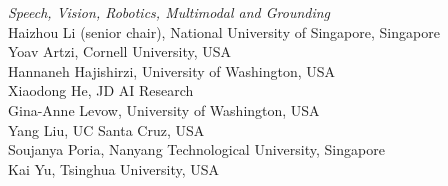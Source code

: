 \emph{Speech, Vision, Robotics, Multimodal and Grounding} \\
\hspace*{0.2in}Haizhou Li (senior chair), National University of Singapore, Singapore \\
\hspace*{0.2in}Yoav Artzi, Cornell University, USA \\
\hspace*{0.2in}Hannaneh Hajishirzi, University of Washington, USA \\
\hspace*{0.2in}Xiaodong He, JD AI Research \\
\hspace*{0.2in}Gina-Anne Levow, University of Washington, USA \\
\hspace*{0.2in}Yang Liu, UC Santa Cruz, USA \\
\hspace*{0.2in}Soujanya Poria, Nanyang Technological University, Singapore \\
\hspace*{0.2in}Kai Yu, Tsinghua University, USA 


